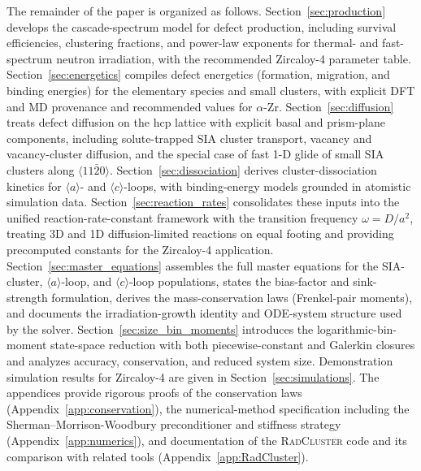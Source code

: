 The remainder of the paper is organized as follows.
Section~\ref{sec:production} develops the cascade-spectrum model for
defect production, including survival efficiencies, clustering
fractions, and power-law exponents for thermal- and fast-spectrum
neutron irradiation, with the recommended Zircaloy-4 parameter table.
Section~\ref{sec:energetics} compiles defect energetics
(formation, migration, and binding energies) for the elementary
species and small clusters, with explicit DFT and MD provenance and
recommended values for $\alpha$-Zr.
Section~\ref{sec:diffusion} treats defect diffusion on the hcp
lattice with explicit basal and prism-plane components, including
solute-trapped SIA cluster transport, vacancy and vacancy-cluster
diffusion, and the special case of fast 1-D glide of small SIA
clusters along $\langle 11\bar{2}0\rangle$.
Section~\ref{sec:dissociation} derives cluster-dissociation kinetics
for $\langle a\rangle$- and $\langle c\rangle$-loops, with
binding-energy models grounded in atomistic simulation data.
Section~\ref{sec:reaction_rates} consolidates these inputs into the
unified reaction-rate-constant framework with the transition
frequency $\omega = D/a^{2}$, treating 3D and 1D
diffusion-limited reactions on equal footing and providing
precomputed constants for the Zircaloy-4 application.
Section~\ref{sec:master_equations} assembles the full master
equations for the SIA-cluster, $\langle a\rangle$-loop, and
$\langle c\rangle$-loop populations, states the bias-factor and
sink-strength formulation, derives the mass-conservation laws
(Frenkel-pair moments), and documents the irradiation-growth
identity and ODE-system structure used by the solver.
Section~\ref{sec:size_bin_moments} introduces the
logarithmic-bin-moment state-space reduction with both
piecewise-constant and Galerkin closures and analyzes accuracy,
conservation, and reduced system size.
 Demonstration simulation results for
Zircaloy-4 are given in Section~\ref{sec:simulations}.
The appendices provide rigorous proofs of the conservation laws
(Appendix~\ref{app:conservation}), the numerical-method
specification including the Sherman--Morrison-Woodbury
preconditioner and stiffness strategy
(Appendix~\ref{app:numerics}), and documentation of the
\textsc{RadCluster} code and its comparison with related tools
(Appendix~\ref{app:RadCluster}).


